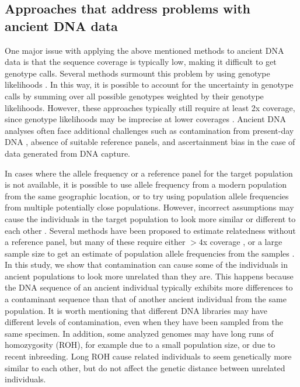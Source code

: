 \documentclass[12pt, letterpaper]{article}
\begin{document}
\subsection{Approaches that address problems with ancient DNA data}
One major issue with applying the above mentioned methods to ancient DNA data is that the sequence coverage is typically low, making it difficult to get genotype calls.
Several methods surmount this problem by using genotype likelihoods \cite{lipatov_maximum_2015,korneliussen_ngsrelate_2015}. In this way, it is possible to account for the uncertainty in genotype calls by summing over all possible genotypes weighted by their genotype likelihoods. However, these approaches typically still require at least 2x coverage, since genotype likelihoods may be imprecise at lower coverages . Ancient DNA analyses often face additional challenges such as contamination from present-day DNA \cite{peyregne_authentict_2020}, absence of suitable reference panels, and ascertainment bias in the case of data generated from DNA capture.

In cases where the allele frequency or a reference panel for the target population is not available, it is possible to use allele frequency from a modern population from the same geographic location, or to try using population allele frequencies from multiple potentially close populations. However, incorrect assumptions may cause the individuals in the target population to look more similar or different to each other \cite{amorim_understanding_2018}. Several methods have been proposed to estimate relatedness without a reference panel, but many of these require either $>4$x coverage \cite{waples_allele_2019}, or a large sample size to get an estimate of population allele frequencies from the samples \cite{theunert_joint_2017}. In this study, we show that contamination can cause some of the individuals in ancient populations to look more unrelated than they are. This happens because the DNA sequence of an ancient individual typically exhibits more differences to a contaminant sequence than that of another ancient individual from the same population. It is worth mentioning that different DNA libraries may have different levels of contamination, even when they have been sampled from the same specimen. In addition, some analyzed  genomes  may have long runs of homozygosity (ROH), for example due to a small population size, or due to recent inbreeding. Long ROH cause related individuals to seem genetically more similar to each other, but do not affect the genetic distance between unrelated individuals.
\end{document}
